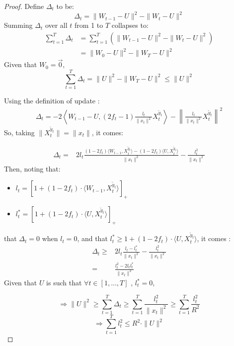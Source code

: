 \documentclass[preprint,12pt,authoryear]{elsarticle}
\begin{document}
\begin{proof}
	Define $\Delta_t$ to be:
	\[\Delta_t = \parallel{W_{t-1}-U}\parallel^2-\parallel{W_t-U}\parallel^2\]
	Summing $\Delta_t$ over all $t$ from 1 to $T$ collapses to:
	\begin{align}
	\sum_{t=1}^{T}\Delta_t &= \sum_{t=1}^{T} \left( \parallel{W_{t-1} - U}\parallel^2-\parallel{W_t - U}\parallel^2 \right)\nonumber\\ 
	&= \parallel{W_0 - U}\parallel^2-\parallel{W_T-U}\parallel^2\nonumber
	\end{align}	
	Given that $W_0 = \vec{0}$, 
	\begin{equation}
	\label{equa:delta}
	\sum_{t=1}^{T}\Delta_t = \parallel{U}\parallel^2 - \parallel{W_T-U}\parallel^2 \leqslant \parallel{U}\parallel^2 
	\end{equation}
	
	Using the definition of update : %
	\begin{align}
	\Delta_t = -2\left\langle W_{t-1} - U, (2f_t-1)\frac{l_t}{\parallel{x_t}\parallel^2}X_t^{\tilde{y}_t}\right\rangle 
	- \left\| \frac{l_t}{\parallel{x_t}\parallel^2}X_t^{\tilde{y}_t}\right\|^2
	\nonumber
	\end{align}
	So, taking $\parallel{X_t^{\tilde{y}_t}}\parallel = \parallel x_t\parallel$, it comes:

	\begin{align}
	\Delta_t =& 2l_t\frac{(1-2f_t)\langle W_{t-1}, X_t^{\tilde{y}_t}\rangle - (1-2f_t)\langle U, X_t^{\tilde{y}_t}\rangle}{\|x_t\|^2}
	-\frac{l_t^2}{\parallel{x_t}\parallel^2}\nonumber
	\end{align}
	Then, noting that:
		\begin{itemize}
			\item[] $l_t = [1+(1-2f_t)\cdot\langle W_{t-1},X_t^{\tilde{y}_t}\rangle]_+$
			\item[] $l_t^{\ast} = [1+(1-2f_t)\cdot\langle U,X_t^{\tilde{y}_t}\rangle]_+$
		\end{itemize}
		that $\Delta_t = 0$ when $l_t = 0$, and that $l^*_t \geq  1+(1-2f_t)\cdot\langle U,X_t^{\tilde{y}_t}\rangle$, it comes : 
	\begin{align}
	\Delta_t\geqslant& 2l_t\frac{l_t - l_t^{\ast}}{\parallel{x_t}\parallel^2}-\frac{l_t^2}{\parallel{x_t}\parallel^2}\nonumber\\
	=& \frac{l_t^2-2l_t l_t^{\ast}}{\parallel x_t\parallel^2}\nonumber
	\end{align}
	Given that $U$ is such that $\forall t \in [1,...,T]$ , $l_t^{\ast} = 0$,
	
	\[\Rightarrow \parallel{U}\parallel^2 \geqslant \sum_{t=1}^{T}\Delta_t \geqslant \sum_{t=1}^{T}  \frac{l_t^2}{\parallel{x_t}\parallel^2}
	\geqslant 
	\sum_{t=1}^{T}  \frac{l_t^2}{R^2}
	\]
	\[\Rightarrow\sum_{t=1}^{T} l_t^2 \leqslant R^2 \cdot \parallel{U}\parallel^2\]
\end{proof}
\end{document}
